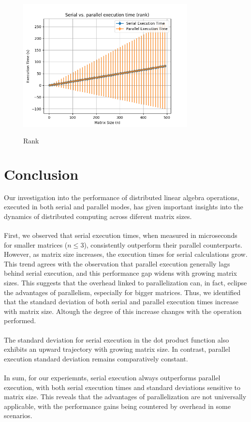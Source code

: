 \begin{figure}[H]
    \includegraphics[width=0.8\textwidth, keepaspectratio]{../img/rank_2_500_5.png}
    \centering
    \label{fig:rank}
    \caption{Rank}
\end{figure}  

\section{Conclusion}
Our investigation into the performance of distributed linear algebra operations, executed in both serial and parallel modes, has given important insights into the dynamics of distributed computing across diferent matrix sizes.
\\\\
First, we observed that serial execution times, when measured in microseconds for smaller matrices ($n \le 3$), consistently outperform their parallel counterparts. However, as matrix size increases, the execution times for serial calculations grow. This trend agrees with the observation that parallel execution generally lags behind serial execution, and this performance gap widens with growing matrix sizes. This suggests that the overhead linked to parallelization can, in fact, eclipse the advantages of parallelism, especially for bigger matrices. Thus, we identified that the standard deviation of both serial and parallel execution times increase with matrix size. Altough the degree of this increase changes with the operation performed.
\\\\
The standard deviation for serial execution in the dot product function also exhibits an upward trajectory with growing matrix size. In contrast, parallel execution standard deviation remains comparatively constant.
\\\\
In sum, for our experiemnts, serial execution always outperforms parallel execution, with both serial execution times and standard deviations sensitive to matrix size. This reveals that the advantages of parallelization are not universally applicable, with the performance gains being countered by overhead in some scenarios.

